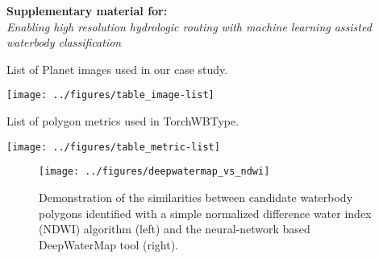 \documentclass[12pt]{article}
\begin{document}
\begin{center}
\textbf{Supplementary material for:}\\
\emph{Enabling high resolution hydrologic routing with machine learning assisted waterbody classification}
\end{center}

\begin{table}[h!]
    \begin{center}
          \caption{List of Planet images used in our case study.}
          \texttt{[image: ../figures/table\_image-list]}
    \end{center}    
\end{table}

\begin{table}[h!]
    \begin{center}
          \caption{List of polygon metrics used in TorchWBType.}
          \texttt{[image: ../figures/table\_metric-list]}
    \end{center}    
\end{table}

\begin{figure}[h!]
    \begin{center}
          \texttt{[image: ../figures/deepwatermap\_vs\_ndwi]}
          \caption{Demonstration of the similarities between candidate waterbody polygons identified with a simple normalized difference water index (NDWI) algorithm (left) and the neural-network based DeepWaterMap tool (right).}
    \end{center}    
\end{figure}

\clearpage
\end{document}
